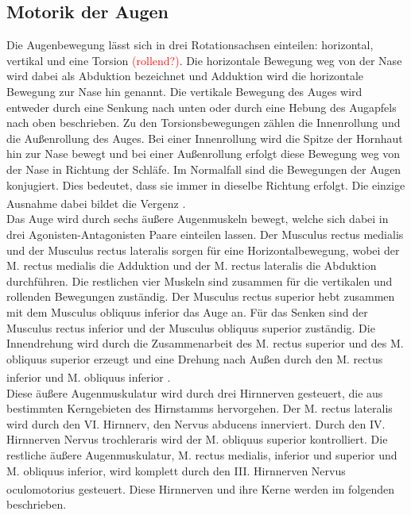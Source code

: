 \documentclass[12pt,a4paper,pdftex]{article}
\begin{document}
\subsection{Motorik der Augen}
Die Augenbewegung lässt sich in drei Rotationsachsen einteilen: horizontal, vertikal und eine Torsion \textcolor{red}{(rollend?)}. Die horizontale Bewegung weg von der Nase wird dabei als Abduktion bezeichnet und Adduktion wird die horizontale Bewegung zur Nase hin genannt. Die vertikale Bewegung des Auges wird entweder durch eine Senkung nach unten oder durch eine Hebung des Augapfels nach oben beschrieben. Zu den Torsionsbewegungen zählen die Innenrollung und die Außenrollung des Auges. Bei einer Innenrollung wird die Spitze der Hornhaut hin zur Nase bewegt und bei einer Außenrollung erfolgt diese Bewegung weg von der Nase in Richtung der Schläfe. Im Normalfall sind die Bewegungen der Augen konjugiert. Dies bedeutet, dass sie immer in dieselbe Richtung erfolgt. Die einzige Ausnahme dabei bildet die Vergenz \textsuperscript{\cite[39]{kandel2013principles}}. \\
Das Auge wird durch sechs äußere Augenmuskeln bewegt, welche sich dabei in drei Agonisten-Antagonisten Paare einteilen lassen. Der Musculus rectus medialis und der Musculus rectus lateralis sorgen für eine Horizontalbewegung, wobei der M. rectus medialis die Adduktion und der M. rectus lateralis die Abduktion durchführen. Die restlichen vier Muskeln sind zusammen für die vertikalen und rollenden Bewegungen zuständig. Der Musculus rectus superior hebt zusammen mit dem Musculus obliquus inferior das Auge an. Für das Senken sind der Musculus rectus inferior und der Musculus obliquus superior zuständig. Die Innendrehung wird durch die Zusammenarbeit des M. rectus superior und des M. obliquus superior erzeugt und eine Drehung nach Außen durch den M. rectus inferior und M. obliquus inferior \textsuperscript{\cite[39]{kandel2013principles}}. \\  
Diese äußere Augenmuskulatur wird durch drei Hirnnerven gesteuert, die aus bestimmten Kerngebieten des Hirnstamms hervorgehen. Der M. rectus lateralis wird durch den VI. Hirnnerv, den Nervus abducens innerviert. Durch den IV. Hirnnerven Nervus trochleraris wird der M. obliquus superior kontrolliert. Die restliche äußere Augenmuskulatur, M. rectus medialis, inferior und superior und M. obliquus inferior, wird komplett durch den III. Hirnnerven Nervus oculomotorius gesteuert\textsuperscript{\cite[39]{kandel2013principles}}. Diese Hirnnerven und ihre Kerne werden im folgenden beschrieben.   
\end{document}
